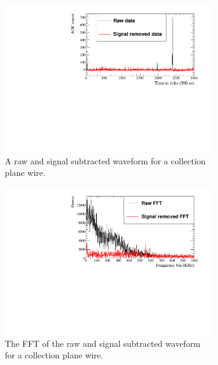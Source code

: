 \begin{figure}[h!]
  \centering
  \begin{subfigure}{0.48\textwidth}
    \centering
    \includegraphics[width=\textwidth]{Waveforms}
    \caption{A raw and signal subtracted waveform for a collection plane wire.}
    \label{fig:FreqWaveform}
  \end{subfigure}%
  \hspace{0.03\textwidth}%
  \begin{subfigure}{0.48\textwidth}
    \centering
    \includegraphics[width=\textwidth]{NoiseFFTs}
    \caption{The FFT of the raw and signal subtracted waveform for a collection plane wire.}
    \label{fig:FreqFFT}
  \end{subfigure}
  \begin{subfigure}{0.48\textwidth}

\end{subfigure}
\end{figure}
